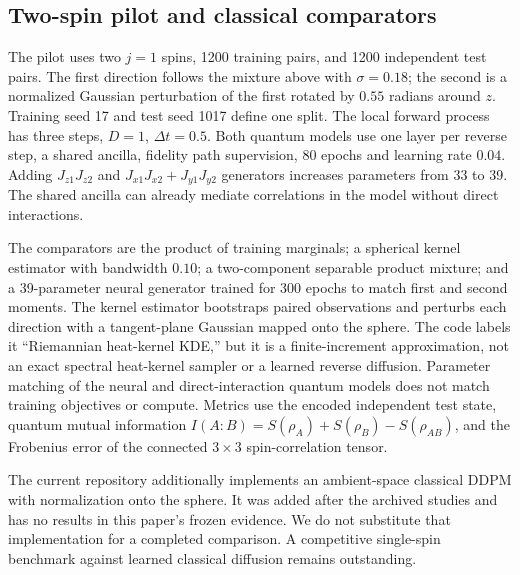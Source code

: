 \subsection{Two-spin pilot and classical comparators}
The pilot uses two $j=1$ spins, 1200 training pairs, and 1200 independent test pairs. The first direction follows the mixture above with $\sigma=0.18$; the second is a normalized Gaussian perturbation of the first rotated by $0.55$ radians around $z$. Training seed 17 and test seed 1017 define one split. The local forward process has three steps, $D=1$, $\Delta t=0.5$. Both quantum models use one layer per reverse step, a shared ancilla, fidelity path supervision, 80 epochs and learning rate $0.04$. Adding $J_{z1}J_{z2}$ and $J_{x1}J_{x2}+J_{y1}J_{y2}$ generators increases parameters from 33 to 39. The shared ancilla can already mediate correlations in the model without direct interactions.

The comparators are the product of training marginals; a spherical kernel estimator with bandwidth $0.10$; a two-component separable product mixture; and a 39-parameter neural generator trained for 300 epochs to match first and second moments. The kernel estimator bootstraps paired observations and perturbs each direction with a tangent-plane Gaussian mapped onto the sphere. The code labels it ``Riemannian heat-kernel KDE,'' but it is a finite-increment approximation, not an exact spectral heat-kernel sampler or a learned reverse diffusion. Parameter matching of the neural and direct-interaction quantum models does not match training objectives or compute. Metrics use the encoded independent test state, quantum mutual information $I(A:B)=S(\rho_A)+S(\rho_B)-S(\rho_{AB})$, and the Frobenius error of the connected $3\times3$ spin-correlation tensor.

The current repository additionally implements an ambient-space classical DDPM with normalization onto the sphere. It was added after the archived studies and has no results in this paper's frozen evidence. We do not substitute that implementation for a completed comparison. A competitive single-spin benchmark against learned classical diffusion remains outstanding.
